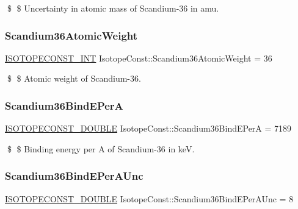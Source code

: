 \$ \$ Uncertainty in atomic mass of Scandium-\/36 in amu. \mbox{\label{group___isotope_const-_scandium-_sc36_ga90f1079f40627154cd3a5bcf25191faf}} 
\subsubsection{\texorpdfstring{Scandium36\+Atomic\+Weight}{Scandium36AtomicWeight}}
{\footnotesize\ttfamily \mbox{\hyperlink{group___isotope_const-_macros_ga5f18360b3e99483a35c32d789e62621c}{I\+S\+O\+T\+O\+P\+E\+C\+O\+N\+S\+T\+\_\+\+I\+NT}} Isotope\+Const\+::\+Scandium36\+Atomic\+Weight = 36}

\$ \$ Atomic weight of Scandium-\/36. \mbox{\label{group___isotope_const-_scandium-_sc36_gab7bf1c177cd1f89ba11b527c65e57644}} 
\subsubsection{\texorpdfstring{Scandium36\+Bind\+E\+PerA}{Scandium36BindEPerA}}
{\footnotesize\ttfamily \mbox{\hyperlink{group___isotope_const-_macros_ga8f45a7272ce02c0b4c65c44636ed719a}{I\+S\+O\+T\+O\+P\+E\+C\+O\+N\+S\+T\+\_\+\+D\+O\+U\+B\+LE}} Isotope\+Const\+::\+Scandium36\+Bind\+E\+PerA = 7189}

\$ \$ Binding energy per A of Scandium-\/36 in keV. \mbox{\label{group___isotope_const-_scandium-_sc36_ga3bd92c01f562489827f2d174d7582c18}} 
\subsubsection{\texorpdfstring{Scandium36\+Bind\+E\+Per\+A\+Unc}{Scandium36BindEPerAUnc}}
{\footnotesize\ttfamily \mbox{\hyperlink{group___isotope_const-_macros_ga8f45a7272ce02c0b4c65c44636ed719a}{I\+S\+O\+T\+O\+P\+E\+C\+O\+N\+S\+T\+\_\+\+D\+O\+U\+B\+LE}} Isotope\+Const\+::\+Scandium36\+Bind\+E\+Per\+A\+Unc = 8}

